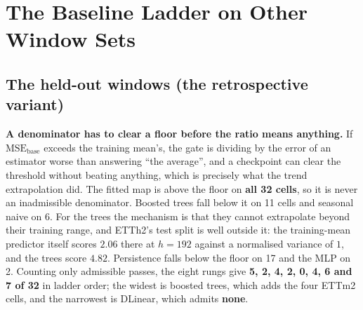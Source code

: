 \section{The Baseline Ladder on Other Window Sets}
\subsection{The held-out windows (the retrospective variant)}
\label{app:baselines:test}

\begin{table}[ht]
\centering
\caption{\textbf{Gate $\Vb{b}$ under eight denominators and a floor, on
one numerator, over the \emph{held-out} windows.}  The retrospective variant,
retained because the prospective predictor of \S\ref{sec:analysis:prospective}
was frozen against it.
Bold clears $0.20$.  A dagger marks a denominator worse than the
training-mean predictor on that cell: the ratio is still arithmetic, but it is
not evidence of a pre-trained advantage, so daggered cells are excluded from the
``and admissible'' tally.  The training-mean column is the floor, not a candidate
estimator.  The last row applies the three-clause degradation definition of
\S\ref{sec:method} with clause~(i) taken from each estimator and clauses~(ii)
and~(iii) unchanged, over the 31 cells with a paired frozen-encoder run.
Generated by \texttt{scripts/gate\_baseline\_sensitivity.py}.}
\label{tab:baselinefamily}

\end{table}

\textbf{A denominator has to clear a floor before the ratio means anything.}  If
$\text{MSE}_\text{base}$ exceeds the training mean's, the gate is dividing by the
error of an estimator worse than answering ``the average'', and a checkpoint can
clear the threshold without beating anything, which is precisely what the trend
extrapolation did.  The fitted map is above the floor on \textbf{all 32 cells},
so it is never an inadmissible denominator.
Boosted trees fall below it on 11 cells and seasonal naive on 6.  For the trees
the mechanism is that they cannot extrapolate beyond their training range, and
ETTh2's test split is well outside it: the training-mean predictor itself scores
$2.06$ there at $h{=}192$ against a normalised variance of $1$, and the trees
score $4.82$.  Persistence falls below the floor on 17 and the MLP on 2.
Counting only admissible passes, the eight rungs give \textbf{5, 2, 4, 2, 0, 4, 6
and 7 of 32} in ladder order; the widest is boosted trees, which adds the four
ETTm2 cells, and the narrowest is DLinear, which admits \textbf{none}.

